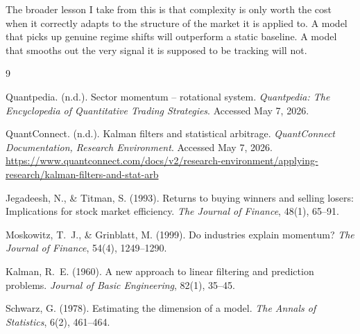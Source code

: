 \documentclass[12pt]{article}
\begin{document}
The broader lesson I take from this is that complexity is only worth the cost when it correctly adapts to the structure of the market it is applied to. A model that picks up genuine regime shifts will outperform a static baseline. A model that smooths out the very signal it is supposed to be tracking will not.


\begin{thebibliography}{9}

Quantpedia. (n.d.).
\newblock Sector momentum -- rotational system.
\newblock \textit{Quantpedia: The Encyclopedia of Quantitative Trading Strategies}.
\newblock Accessed May 7, 2026.

QuantConnect. (n.d.).
\newblock Kalman filters and statistical arbitrage.
\newblock \textit{QuantConnect Documentation, Research Environment}.
\newblock Accessed May 7, 2026.
\newblock \url{https://www.quantconnect.com/docs/v2/research-environment/applying-research/kalman-filters-and-stat-arb}

Jegadeesh, N., \& Titman, S. (1993).
\newblock Returns to buying winners and selling losers: Implications for stock market efficiency.
\newblock \textit{The Journal of Finance}, 48(1), 65--91.

Moskowitz, T.~J., \& Grinblatt, M. (1999).
\newblock Do industries explain momentum?
\newblock \textit{The Journal of Finance}, 54(4), 1249--1290.

Kalman, R.~E. (1960).
\newblock A new approach to linear filtering and prediction problems.
\newblock \textit{Journal of Basic Engineering}, 82(1), 35--45.

Schwarz, G. (1978).
\newblock Estimating the dimension of a model.
\newblock \textit{The Annals of Statistics}, 6(2), 461--464.

\end{thebibliography}
\end{document}
